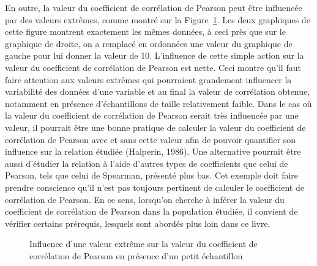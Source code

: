 \documentclass[
  letterpaper,
]{book}
\begin{document}
En outre, la valeur du coefficient de corrélation de Pearson peut être
influencée par des valeurs extrêmes, comme montré sur la
Figure~\ref{fig-spuriousCorrelationBis}. Les deux graphiques de cette
figure montrent exactement les mêmes données, à ceci près que sur le
graphique de droite, on a remplacé en ordonnées une valeur du graphique
de gauche pour lui donner la valeur de 10. L'influence de cette simple
action sur la valeur du coefficient de corrélation de Pearson est nette.
Ceci montre qu'il faut faire attention aux valeurs extrêmes qui
pourraient grandement influencer la variabilité des données d'une
variable et au final la valeur de corrélation obtenue, notamment en
présence d'échantillons de taille relativement faible. Dans le cas où la
valeur du coefficient de corrélation de Pearson serait très influencée
par une valeur, il pourrait être une bonne pratique de calculer la
valeur du coefficient de corrélation de Pearson avec et sans cette
valeur afin de pouvoir quantifier son influence sur la relation étudiée
(Halperin, 1986). Une alternative pourrait être aussi d'étudier la
relation à l'aide d'autres types de coefficients que celui de Pearson,
tels que celui de Spearman, présenté plus bas. Cet exemple doit faire
prendre conscience qu'il n'est pas toujours pertinent de calculer le
coefficient de corrélation de Pearson. En ce sens, lorsqu'on cherche à
inférer la valeur du coefficient de corrélation de Pearson dans la
population étudiée, il convient de vérifier certains prérequis, lesquels
sont abordés plus loin dans ce livre.

\begin{figure}


\caption{\label{fig-spuriousCorrelationBis}Influence d'une valeur
extrême sur la valeur du coefficient de corrélation de Pearson en
présence d'un petit échantillon}

\end{figure}%
\end{document}
